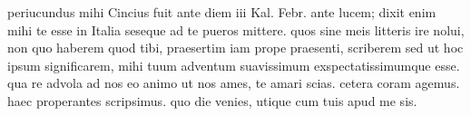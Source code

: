 


 periucundus mihi Cincius fuit ante diem iii Kal. Febr. ante lucem; dixit enim mihi te esse in Italia seseque ad te pueros mittere. quos sine meis litteris ire nolui, non quo haberem quod tibi, praesertim iam prope praesenti, scriberem sed ut hoc ipsum significarem, mihi tuum adventum suavissimum exspectatissimumque esse. qua re advola ad nos eo animo ut nos ames, te amari scias. cetera coram agemus. haec properantes scripsimus. quo die venies, utique cum tuis apud me sis.

